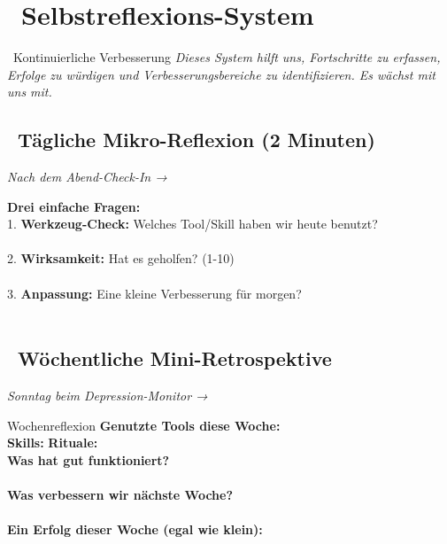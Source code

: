 \newpage
\section*{\textcolor{ctmmPurple}{\faChartLine~Selbstreflexions-System}}
\label{sec:feedback}

\begin{ctmmPurpleBox}{\faSync~Kontinuierliche Verbesserung}
\textit{Dieses System hilft uns, Fortschritte zu erfassen, Erfolge zu würdigen und Verbesserungsbereiche zu identifizieren. Es wächst mit uns mit.}
\end{ctmmPurpleBox}

\subsection*{\faCalendar~Tägliche Mikro-Reflexion (2 Minuten)}
\label{sec:5.1}
\textit{Nach dem Abend-Check-In → }

\textbf{Drei einfache Fragen:}\\[0.3cm]
1. \textbf{Werkzeug-Check:} Welches Tool/Skill haben wir heute benutzt?\\
\\[0.3cm]

2. \textbf{Wirksamkeit:} Hat es geholfen? (1-10)\\
\\[0.3cm]

3. \textbf{Anpassung:} Eine kleine Verbesserung für morgen?\\
\\[0.5cm]

\subsection*{\faCalendar~Wöchentliche Mini-Retrospektive}
\textit{Sonntag beim Depression-Monitor → }

\begin{ctmmYellowBox}{Wochenreflexion}
\textbf{Genutzte Tools diese Woche:}\\
 \quad \textbf{Skills:}  \quad \textbf{Rituale:} \\[0.3cm]

\textbf{Was hat gut funktioniert?}\\
\\[0.3cm]

\textbf{Was verbessern wir nächste Woche?}\\
\\[0.3cm]

\textbf{Ein Erfolg dieser Woche (egal wie klein):}\\
\end{ctmmYellowBox}


